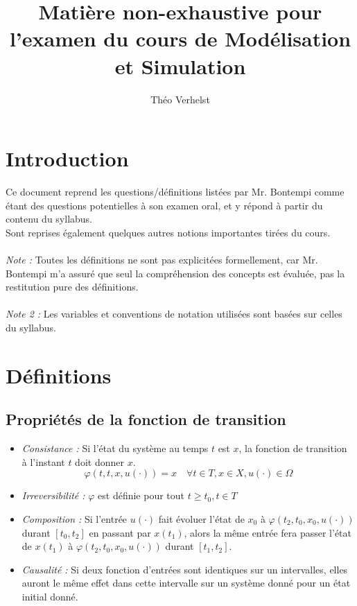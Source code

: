 \documentclass[a4paper]{article}
\author{Théo Verhelst}
\title{Matière non-exhaustive pour l'examen du cours de Modélisation et
Simulation}
\begin{document}
\maketitle
\tableofcontents
\section{Introduction}
Ce document reprend les questions/définitions listées par Mr. Bontempi comme
étant des questions potentielles à son examen oral, et y répond à partir du
contenu du syllabus.\\
Sont reprises également quelques autres notions importantes tirées du cours.
\paragraph{}
\emph{Note :} Toutes les définitions ne sont pas explicitées formellement, car
Mr. Bontempi m'a assuré que seul la compréhension des concepts est évaluée, pas
la restitution pure des définitions.
\paragraph{}
\emph{Note 2 :} Les variables et conventions de notation utilisées sont basées
sur celles du syllabus.
\section{Définitions}

\subsection{Propriétés de la fonction de transition}
\begin{itemize}
	\item \emph{Consistance :} Si l'état du système au temps $t$ est $x$,
		la fonction de transition à l'instant $t$ doit donner $x$.
		\[\varphi(t,t,x,u(\cdot))=x\quad\forall t\in T, x\in X,
		u(\cdot)\in\Omega\]
	\item \emph{Irreversibilité :} $\varphi$ est définie pour tout
		\(t \ge t_0, t\in T\)
	\item \emph{Composition :} Si l'entrée $u(\cdot)$ fait évoluer l'état de
		$x_0$ à $\varphi(t_2,t_0,x_0,u(\cdot))$ durant $[t_0,t_2]$ en passant
		par $x(t_1)$, alors la même entrée fera passer l'état de $x(t_1)$ à
		$\varphi(t_2,t_0,x_0,u(\cdot))$ durant $[t_1,t_2]$.
	\item \emph{Causalité :} Si deux fonction d'entrées sont identiques sur un
		intervalles, elles auront le même effet dans cette intervalle sur un
		système donné pour un état initial donné.
\end{itemize}
\end{document}
